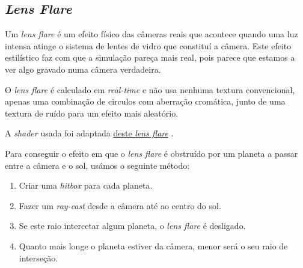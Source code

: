 \newpage
\subsection{\textit{Lens Flare}}

Um \textit{lens flare} é um efeito físico das câmeras reais que acontece quando uma luz intensa atinge o sistema de lentes de vidro que constituí a câmera. Este efeito estilístico faz com que a simulação pareça mais real, pois parece que estamos a ver algo gravado numa câmera verdadeira.

\noindent
O \textit{lens flare} é calculado em \textit{real-time} e não usa nenhuma textura convencional, apenas uma combinação de circulos com aberração cromática, junto de uma textura de ruído para um efeito mais aleatório.  

\noindent
A \textit{shader} usada foi adaptada \hyperlink{https://www.shadertoy.com/view/4sX3Rs}{deste \textit{lens flare}} \cite{shadertoy}.

\noindent
Para conseguir o efeito em que o \textit{lens flare} é obstruído por um planeta a passar entre a câmera e o sol, usámos o seguinte método:
\begin{enumerate}
    \item Criar uma \textit{hitbox} para cada planeta.
    \item Fazer um \textit{ray-cast} desde a câmera até ao centro do sol.
    \item Se este raio intercetar algum planeta, o \textit{lens flare} é desligado.
    \item Quanto mais longe o planeta estiver da câmera, menor será o seu raio de interseção.
\end{enumerate}

